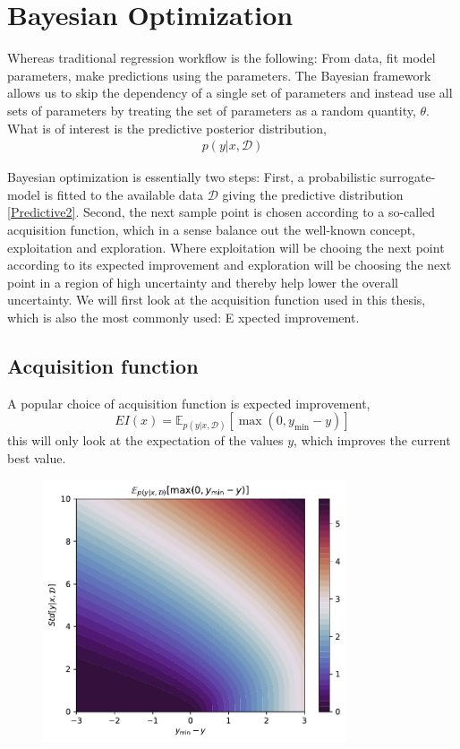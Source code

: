 \chapter{Bayesian Optimization}
Whereas traditional regression workflow is the following: From data, fit model parameters, make predictions using the parameters. 
The Bayesian framework allows us to skip the dependency of a single set of parameters and instead use all sets of parameters 
by treating the set of parameters as a random quantity, $\theta$. What is of interest is the predictive posterior distribution,  
\begin{align}\label{Predictive2}
    p(y|x, \mathcal{D})
\end{align}

Bayesian optimization is essentially two steps: First, a probabilistic surrogate-model is fitted
to the available data $\mathcal{D}$ giving the predictive distribution \eqref{Predictive2}. Second,
the next sample point is chosen according to a so-called acquisition function, which in a sense
balance out the well-known concept, exploitation and exploration. Where exploitation will be chooing
the next point according to its expected improvement and exploration will be choosing the next point
in a region of high uncertainty and thereby help lower the overall uncertainty. We will first look at
the acquisition function used in this thesis, which is also the most commonly used: E   xpected improvement. 

\section{Acquisition function}
A popular choice of acquisition function is expected improvement, 
$$EI(x) = \mathbb{E}_{p(y|x,\mathcal{D})}[\max(0, y_{\min}-y)]$$
this will only look at the expectation of the values $y$, which improves the current best value.

\begin{figure}[H]
    \centering
    \includegraphics[width=0.8\textwidth]{Pictures/expected_improvement_illustration.pdf}
\end{figure}


